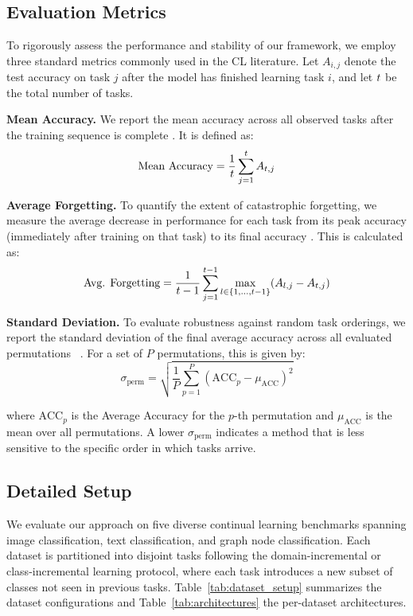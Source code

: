 \subsection{Evaluation Metrics}
\label{sec:metrics}

To rigorously assess the performance and stability of our framework, we employ three standard metrics commonly used in the CL literature. Let $A_{i, j}$ denote the test accuracy on task $j$ after the model has finished learning task $i$, and let $t$ be the total number of tasks. 

\textbf{Mean Accuracy.} We report the mean accuracy across all observed tasks after the training sequence is complete . It is defined as: 
\begin{equation}
    \text{Mean Accuracy} = \frac{1}{t} \sum_{j=1}^{t} A_{t, j}
\end{equation}

\textbf{Average Forgetting.} To quantify the extent of catastrophic forgetting, we measure the average decrease in performance for each task from its peak accuracy (immediately after training on that task) to its final accuracy \cite{yoon2019scalable}. This is calculated as: 
\begin{equation}
    \text{Avg. Forgetting} = \frac{1}{t-1} \sum_{j=1}^{t-1} \max_{l \in \{1, \dots, t-1\}} (A_{l,j} - A_{t,j})
\end{equation}

\textbf{Standard Deviation.} To evaluate robustness against random task orderings, we report the standard deviation of the final average accuracy across all evaluated permutations ~\cite{bell2022effect}. For a set of $P$ permutations, this is given by:
\begin{equation}
    \sigma_{\text{perm}} = \sqrt{\frac{1}{P} \sum_{p=1}^{P} (\text{ACC}_p - \mu_{\text{ACC}})^2}
\end{equation}

where $\text{ACC}_p$ is the Average Accuracy for the $p$-th permutation and $\mu_{\text{ACC}}$ is the mean over all permutations. A lower $\sigma_{\text{perm}}$ indicates a method that is less sensitive to the specific order in which tasks arrive.

\subsection{Detailed Setup}
\label{sec:detailed_setup}

We evaluate our approach on five diverse continual learning
benchmarks spanning image classification, text classification, and graph
node classification. Each dataset is partitioned into disjoint tasks
following the domain-incremental or class-incremental learning protocol, where each task introduces a new subset of classes not seen in previous tasks.
Table~\ref{tab:dataset_setup} summarizes the dataset configurations and Table~\ref{tab:architectures} the per-dataset
architectures.

